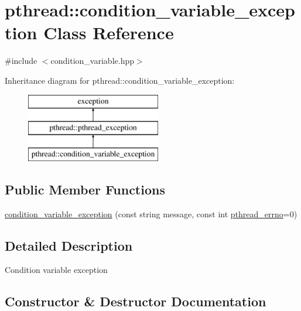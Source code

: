 \hypertarget{classpthread_1_1condition__variable__exception}{}\section{pthread\+:\+:condition\+\_\+variable\+\_\+exception Class Reference}
\label{classpthread_1_1condition__variable__exception}


{\ttfamily \#include $<$condition\+\_\+variable.\+hpp$>$}

Inheritance diagram for pthread\+:\+:condition\+\_\+variable\+\_\+exception\+:\begin{figure}[H]
\begin{center}
\leavevmode
\includegraphics[height=3.000000cm]{classpthread_1_1condition__variable__exception}
\end{center}
\end{figure}
\subsection*{Public Member Functions}
\begin{DoxyCompactItemize}
\item 
\hyperlink{classpthread_1_1condition__variable__exception_a00dd4b86da3021ae39baff18c6b5e0fc}{condition\+\_\+variable\+\_\+exception} (const string message, const int \hyperlink{classpthread_1_1pthread__exception_a8a5c22a403ebd14635e912295fe02a1e}{pthread\+\_\+errno}=0)
\end{DoxyCompactItemize}


\subsection{Detailed Description}
Condition variable exception 

\subsection{Constructor \& Destructor Documentation}
\hypertarget{classpthread_1_1condition__variable__exception_a00dd4b86da3021ae39baff18c6b5e0fc}{}
